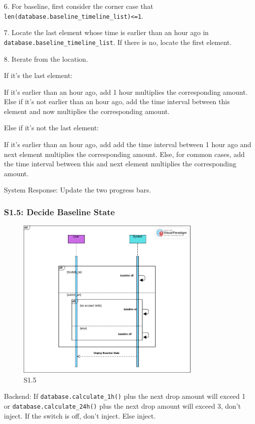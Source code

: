 \documentclass{article}
\begin{document}
6. For baseline, first consider the corner case that \lstinline!len(database.baseline_timeline_list)<=1!.

7. Locate the last element whose time is earlier than an hour ago in \lstinline!database.baseline_timeline_list!. If there is no, locate the first element.

8. Iterate from the location.

If it's the last element:

If it's earlier than an hour ago, add 1 hour multiplies the corresponding amount.
Else if it's not earlier than an hour ago, add the time interval between this element and now multiplies the corresponding amount.

Else if it's not the last element:

If it's earlier than an hour ago, add add the time interval between 1 hour ago and next element multiplies the corresponding amount.
Else, for common cases, add the time interval between this and next element multiplies the corresponding amount.

System Response: Update the two progress bars.
\subsubsection*{S1.5: Decide Baseline State}
\begin{figure}[htbp]
  \centering
  \includegraphics[width=0.8\textwidth]{img/S1_5.png}
  \caption{S1.5}
\end{figure}
Backend: If \lstinline!database.calculate_1h()! plus the next drop amount will exceed 1 or \lstinline!database.calculate_24h()! plus the next drop amount will exceed 3, don't inject. If the switch is off, don't inject. Else inject.
\end{document}
